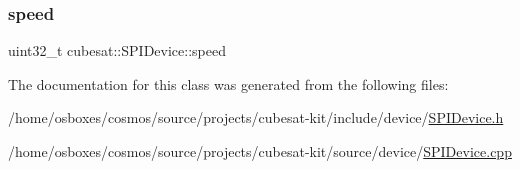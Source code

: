 \mbox{\label{classcubesat_1_1SPIDevice_a528ce66a8be5dd0df22f7bfab20fda25}} 
\subsubsection{\texorpdfstring{speed}{speed}}
{\footnotesize\ttfamily uint32\+\_\+t cubesat\+::\+S\+P\+I\+Device\+::speed\hspace{0.3cm}{\ttfamily [protected]}}



The documentation for this class was generated from the following files\+:\begin{DoxyCompactItemize}
\item 
/home/osboxes/cosmos/source/projects/cubesat-\/kit/include/device/\hyperlink{SPIDevice_8h}{S\+P\+I\+Device.\+h}\item 
/home/osboxes/cosmos/source/projects/cubesat-\/kit/source/device/\hyperlink{SPIDevice_8cpp}{S\+P\+I\+Device.\+cpp}\end{DoxyCompactItemize}
